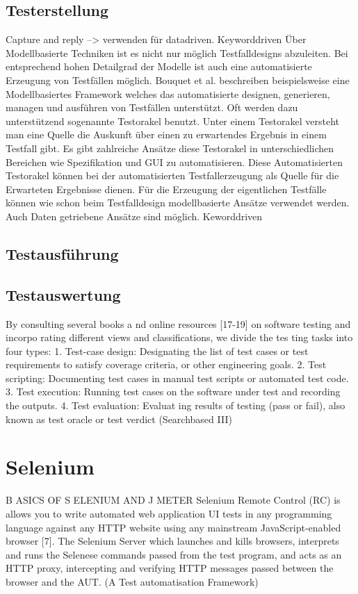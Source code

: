 \subsection{Testerstellung}
\label{subsec:testerstellung}
Capture and reply --> verwenden für datadriven. Keyworddriven
Über Modellbasierte Techniken ist es nicht nur möglich Testfalldesigns abzuleiten. Bei entsprechend hohen Detailgrad der Modelle ist auch eine automatisierte Erzeugung von Testfällen möglich.
Bouquet et al. \cite{bouquet_test_2008} beschreiben beispielsweise eine Modellbasiertes Framework welches das automatisierte designen, generieren, managen und ausführen von Testfällen unterstützt.
Oft werden dazu unterstützend sogenannte Testorakel benutzt. Unter einem Testorakel versteht man eine Quelle die Auskunft über einen zu erwartendes Ergebnis in einem Testfall gibt. Es gibt zahlreiche Ansätze diese Testorakel in unterschiedlichen Bereichen wie Spezifikation und GUI zu automatisieren. \cite{memon_automated_2000} \cite{richardson_specification-based_1992}
\cite{shahamiri_comparative_2009} Diese Automatisierten Testorakel können bei der automatisierten Testfallerzeugung als Quelle für die Erwarteten Ergebnisse dienen.
Für die Erzeugung der eigentlichen Testfälle können wie schon beim Testfalldesign modellbasierte Ansätze verwendet werden.
Auch Daten getriebene Ansätze sind möglich.
Keworddriven

\subsection{Testausführung}
\label{subsec:testausführung}


\subsection{Testauswertung}
\label{subsec:testauswertung}
By consulting several books a
nd online resources [17-19]
on software testing and incorpo
rating different views and
classifications, we divide the tes
ting tasks into four types:
1. Test-case design: Designating the list of test cases or
test requirements to satisfy coverage criteria, or other
engineering goals.
2. Test scripting: Documenting test cases in manual test
scripts or automated test code.
3. Test execution: Running test cases on the software
under test and recording the outputs.
4. Test evaluation: Evaluat
ing results of testing (pass or
fail), also known as test oracle or test verdict (Searchbased III)


\section{Selenium}
\label{sec:selenium}

B
ASICS OF
S
ELENIUM AND
J
METER
Selenium Remote Control (RC) is allows you to write
automated web application UI tests in any programming
language against any HTTP website using any mainstream
JavaScript-enabled browser [7].
The Selenium Server which launches and kills browsers,
interprets and runs the Selenese commands passed from the
test program, and acts as an HTTP proxy, intercepting and
verifying HTTP messages passed between the browser and
the AUT. (A Test automatisation Framework)